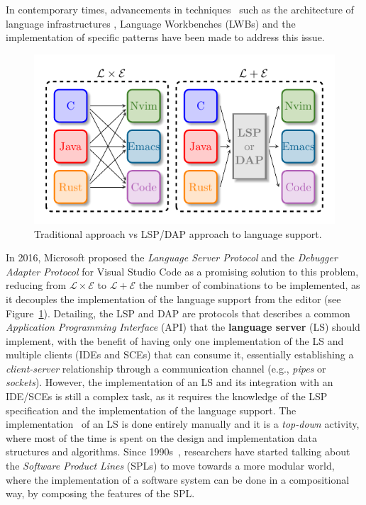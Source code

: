 In contemporary times, advancements in techniques~\cite{Rask21a} such as the architecture of language infrastructures \cite{Lammel18, Voelter13}, Language Workbenches (LWBs) \cite{Erdweg13b} and the implementation of specific patterns \cite{Basten15, Mernik05, Parr09} have been made to address this issue.
\hfill \break
\begin{figure}[t]
    \centering
    \includegraphics[width=0.75\linewidth]{figs/lsp_combinations.pdf}
    \caption{Traditional approach vs LSP/DAP approach to language support.}
    \label{fig:traditional}
\end{figure}
In 2016, Microsoft proposed the \textit{Language Server Protocol} and the \textit{Debugger Adapter Protocol} for Visual Studio Code as a promising solution to this problem, reducing from $\mathcal{L} \times \mathcal{E}$ to $\mathcal{L} + \mathcal{E}$ the number of combinations to be implemented, as it decouples the implementation of the language support from the editor (see Figure~\ref{fig:traditional}).
Detailing, the LSP and DAP are protocols that describes a common \textit{Application Programming Interface} (API) that the \textbf{language server} (LS) should implement, with the benefit of having only one implementation of the LS and multiple clients (IDEs and SCEs) that can consume it, essentially establishing a \textit{client-server} relationship through a communication channel (e.g., \textit{pipes} or \textit{sockets}).
However, the implementation of an LS and its integration with an IDE/SCEs is still a complex task, as it requires the knowledge of the LSP specification and the implementation of the language support.
The implementation~\cite{Gunasinghe22} of an LS is done entirely manually and it is a \textit{top-down} activity, where most of the time is spent on the design and implementation data structures and algorithms.
Since 1990s~\cite{Kang90}, researchers have started talking about the \textit{Software Product Lines} (SPLs) \cite{Cazzola23d, Cazzola20} to move towards a more modular world, where the implementation of a software system can be done in a compositional way, by composing the features of the SPL.
